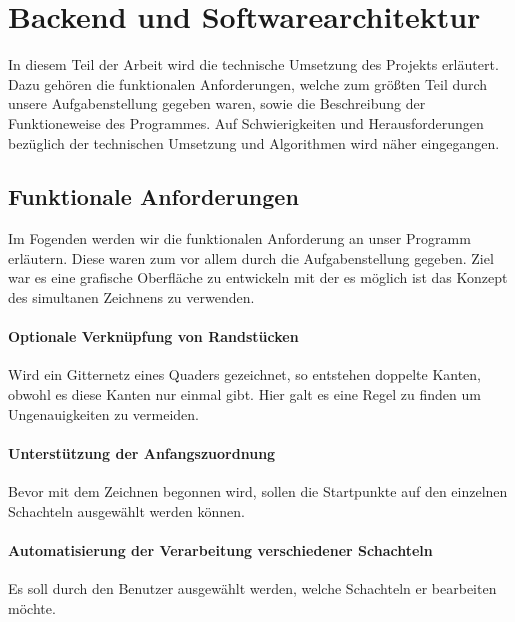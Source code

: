 \section{Backend und Softwarearchitektur}
\label{sec:backend}

In diesem Teil der Arbeit wird die technische Umsetzung des Projekts erläutert. Dazu gehören die funktionalen Anforderungen, welche zum größten Teil durch unsere Aufgabenstellung gegeben waren, sowie die Beschreibung der Funktioneweise des Programmes. Auf Schwierigkeiten und Herausforderungen bezüglich der technischen Umsetzung und Algorithmen wird näher eingegangen.\\


\subsection{Funktionale Anforderungen}
\label{subsec:anforderungen}

Im Fogenden werden wir die funktionalen Anforderung an unser Programm erläutern. Diese waren zum vor allem durch die Aufgabenstellung gegeben. Ziel war es eine grafische Oberfläche zu entwickeln mit der es möglich ist das Konzept des simultanen Zeichnens zu verwenden.

\paragraph{Optionale Verknüpfung von Randstücken}
Wird ein Gitternetz eines Quaders gezeichnet, so entstehen doppelte Kanten, obwohl es diese Kanten nur einmal gibt. Hier galt es eine Regel zu finden um Ungenauigkeiten zu vermeiden.

\paragraph{Unterstützung der Anfangszuordnung}
Bevor mit dem Zeichnen begonnen wird, sollen die Startpunkte auf den einzelnen Schachteln ausgewählt werden können.

\paragraph{Automatisierung der Verarbeitung verschiedener Schachteln}
Es soll durch den Benutzer ausgewählt werden, welche Schachteln er bearbeiten möchte.


